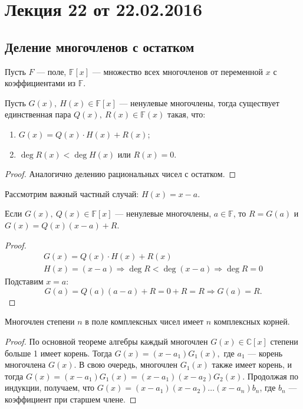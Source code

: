



\section{Лекция 22 от 22.02.2016}

\subsection*{Деление многочленов с остатком}

Пусть $F$ --- поле, $\mathbb{F}[x]$ --- множество всех многочленов от переменной $x$ с коэффициентами из $\mathbb{F}$.
\begin{Theorem}
	Пусть $G(x),\ H(x) \in \mathbb{F}[x]$ --- ненулевые многочлены, тогда существует единственная пара $Q(x),\ R(x) \in \mathbb{F}(x)$ такая, что:
	\begin{enumerate}
		\item $G(x) = Q(x)\cdot H(x) + R(x)$;
		\item $\deg  R(x) < \deg  H(x)$ или $R(x) = 0$.
	\end{enumerate}
\end{Theorem}

\begin{proof}
Аналогично делению рациональных чисел с остатком.
\end{proof}

Рассмотрим важный частный случай: $H(x) = x - a$. 

\begin{Theorem}[Безу]
	Если $G(x),\ Q(x) \in \mathbb{F}[x]$ --- ненулевые многочлены, $a \in \mathbb{F}$, то $R = G(a)$ и $G(x) = Q(x)(x - a) + R$.
\end{Theorem}

\begin{proof}
\begin{gather*}
	G(x) = Q(x)\cdot H(x) + R(x) \\
	H(x) = (x - a) \Rightarrow \deg R < \deg (x - a) \Rightarrow \deg R = 0
\end{gather*}
	Подставим $x = a$:
	$$G(a) = Q(a)(a-a) + R = 0 + R = R \Rightarrow G(a) = R.$$
\end{proof}

\begin{Theorem}
	Многочлен степени $n$ в поле комплексных чисел имеет $n$ комплексных корней.
\end{Theorem}

\begin{proof}
	По основной теореме алгебры каждый многочлен $G(x) \in \mathbb{C}[x]$ степени больше 1 имеет корень. Тогда $G(x) = (x - a_1)G_1(x),$ где $a_1$ --- корень многочлена $G(x)$. В свою очередь, многочлен $G_1(x)$ также имеет корень, и тогда $G(x) = (x - a_1)G_1(x) = (x - a_1)(x - a_2)G_2(x)$. Продолжая по индукции, получаем, что $G(x) = (x - a_1)(x - a_2)\ldots(x - a_n)b_n$, где $b_n$ --- коэффициент при старшем члене.
\end{proof}

